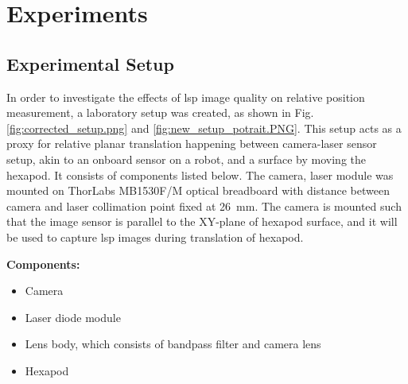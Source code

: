 \chapter{Experiments}

\section{Experimental Setup}

In order to investigate the effects of \gls{lsp} image quality on relative position measurement, a laboratory setup was created, as shown in Fig. \ref{fig:corrected_setup.png} and \ref{fig:new_setup_potrait.PNG}. This setup acts as a proxy for relative planar translation happening between camera-laser sensor setup, akin to an onboard sensor on a robot, and a surface by moving the hexapod. It consists of components listed below. The camera, laser module was mounted on ThorLabs MB1530F/M optical breadboard with distance between camera and laser collimation point fixed at \SI{26}{\milli\meter}. The camera is mounted such that the image sensor is parallel to the XY-plane of hexapod surface, and it will be used to capture \gls{lsp} images during translation of hexapod.

\vspace{2mm}
\noindent \textbf{Components:}
\begin{itemize}
    \item Camera
    \item Laser diode module
    \item Lens body, which consists of bandpass filter and camera lens
    \item Hexapod
\end{itemize}



